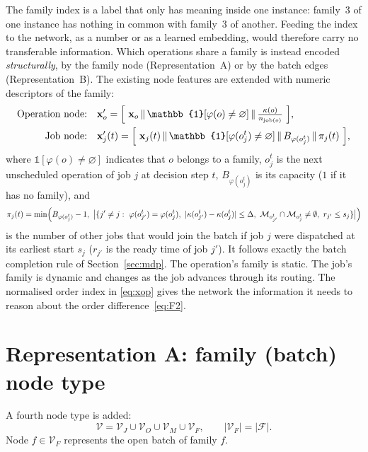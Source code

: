 \documentclass[11pt,a4paper]{article}
\newcommand{\Mset}{\mathcal{M}}
\newcommand{\Fset}{\mathcal{F}}
\newcommand{\Vset}{\mathcal{V}}
\newcommand{\job}{\operatorname{job}}
\newcommand{\cat}{\,\Vert\,}
\begin{document}
The family index is a label that only has meaning inside one instance: family~3 of
one instance has nothing in common with family~3 of another. Feeding the index to
the network, as a number or as a learned embedding, would therefore carry no
transferable information. Which operations share a family is instead encoded
\emph{structurally}, by the family node (Representation~A) or by the batch edges
(Representation~B). The existing node features are extended with numeric
descriptors of the family:
\begin{align}
  \text{Operation node:}\quad &
  \mathbf{x}'_o = \Bigl[\ \mathbf{x}_o \cat \mathbb{1}[\varphi(o)\neq\varnothing] \cat \tfrac{\kappa(o)}{n_{\job(o)}}\ \Bigr],
  \label{eq:xop}\\
  \text{Job node:}\quad &
  \mathbf{x}'_j(t) = \Bigl[\ \mathbf{x}_j(t) \cat \mathbb{1}[\varphi(o_j^t)\neq\varnothing] \cat B_{\varphi(o_j^t)} \cat \pi_j(t)\ \Bigr],
  \label{eq:xjob}
\end{align}
where $\mathbb{1}[\varphi(o)\neq\varnothing]$ indicates that $o$ belongs to a
family, $o_j^t$ is the next unscheduled operation of job $j$ at decision step $t$,
$B_{\varphi(o_j^t)}$ is its capacity ($1$ if it has no family), and
\begin{equation}
  \pi_j(t)=\min\Bigl(B_{\varphi(o_j^t)}-1,\ \bigl|\{j'\neq j:\ \varphi(o_{j'}^t)=\varphi(o_j^t),\
  |\kappa(o_{j'}^t)-\kappa(o_j^t)|\le\Delta,\ \Mset_{o_{j'}^t}\cap\Mset_{o_j^t}\neq\emptyset,\
  r_{j'}\le s_j\}\bigr|\Bigr)
\end{equation}
is the number of other jobs that would join the batch if job $j$ were dispatched at
its earliest start $s_j$ ($r_{j'}$ is the ready time of job $j'$). It follows exactly
the batch completion rule of Section~\ref{sec:mdp}. The operation's family is static. The job's family is dynamic and changes
as the job advances through its routing. The normalised order index in
\eqref{eq:xop} gives the network the information it needs to reason about the
order difference~\eqref{eq:F2}.

\section{Representation A: family (batch) node type}
\label{sec:repA}

A fourth node type is added:
\begin{equation}
  \Vset=\Vset_J\cup\Vset_O\cup\Vset_M\cup\Vset_F,\qquad |\Vset_F|=|\Fset|.
\end{equation}
Node $f\in\Vset_F$ represents the open batch of family $f$.
\end{document}
